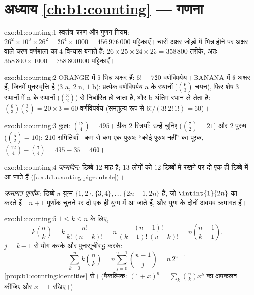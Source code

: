 \section*{अध्याय \ref{ch:b1:counting} --- गणना}

\begin{solution}{exo:b1:counting:1}
स्वतंत्र चरण और गुणन नियम: $26^2 \times 10^3 \times 26^2 = 26^4 \times 1000
= 456\,976\,000$ पट्टिकाएँ। चारों अक्षर जोड़ों में भिन्न होने पर अक्षर वाले
चरण वर्णमाला का $4$-विन्यास बनाते हैं: $26 \times 25 \times 24 \times 23 =
358\,800$ तरीके, अतः $358\,800 \times 1000 = 358\,800\,000$ पट्टिकाएँ।
\end{solution}

\begin{solution}{exo:b1:counting:2}
$\mathrm{ORANGE}$ में $6$ भिन्न अक्षर हैं: $6! = 720$ वर्णविपर्यय।
$\mathrm{BANANA}$ में $6$ अक्षर हैं, जिनमें पुनरावृत्ति है ($3$ a, $2$ n,
$1$ b): प्रत्येक वर्णविपर्यय a के स्थानों ($\binom 63$ चयन), फिर शेष $3$
स्थानों में n के स्थानों ($\binom 32$) से निर्धारित हो जाता है, और b अंतिम
स्थान ले लेता है: $\binom{6}{3}\binom{3}{2} = 20 \times 3 = 60$ वर्णविपर्यय
(समतुल्य रूप से $6!/(3!\,2!\,1!) = 60$)।
\end{solution}

\begin{solution}{exo:b1:counting:3}
कुल: $\binom{12}{4} = 495$। ठीक $2$ स्त्रियाँ: उन्हें चुनिए ($\binom 72 =
21$) और $2$ पुरुष ($\binom 52 = 10$): $210$ समितियाँ। कम से कम एक पुरुष:
``कोई पुरुष नहीं'' का पूरक, $\binom{12}{4} - \binom{7}{4} = 495 - 35 = 460$।
\end{solution}

\begin{solution}{exo:b1:counting:4}
\emph{जन्मदिन:} डिब्बे $12$ माह हैं; $13$ लोगों को $12$ डिब्बों में रखने पर
दो एक ही डिब्बे में आ जाते हैं (\cref{cor:b1:counting:pigeonhole})।

\emph{क्रमागत पूर्णांक:} डिब्बे $n$ युग्म $\{1,2\}, \{3,4\}, \dots, \{2n-1,
2n\}$ हैं, जो $\intint{1}{2n}$ का  करते हैं। $n + 1$ पूर्णांक चुनने पर
दो एक ही युग्म में आ जाते हैं, और युग्म के दोनों अवयव क्रमागत हैं।
\end{solution}

\begin{solution}{exo:b1:counting:5}
$1 \leq k \leq n$ के लिए,
\[
k \binom nk = k\,\frac{n!}{k!\,(n-k)!}
= n\,\frac{(n-1)!}{(k-1)!\,(n-k)!} = n \binom{n-1}{k-1}.
\]
$j = k - 1$ से योग करके और पुनःसूचीबद्ध करके:
\[
\sum_{k=0}^{n} k \binom nk = n \sum_{j=0}^{n-1} \binom{n-1}{j}
= n\, 2^{n-1}
\]
\cref{prop:b1:counting:identities} से। (वैकल्पिक: $(1+x)^n = \sum_k \binom
nk x^k$ का अवकलन कीजिए और $x = 1$ रखिए।)
\end{solution}

